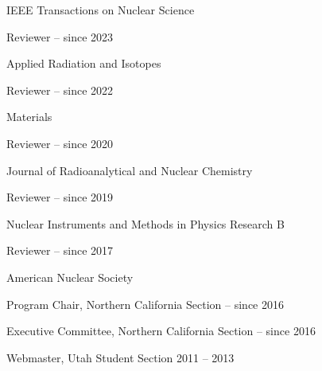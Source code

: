 \begin{list1}
\item[] IEEE Transactions on Nuclear Science
\begin{list2}
\item Reviewer \hfill{ -- since 2023}
\end{list2}
\item[] Applied Radiation and Isotopes
\begin{list2}
\item Reviewer \hfill{ -- since 2022}
\end{list2}
\item[] Materials
\begin{list2}
\item Reviewer \hfill{ -- since 2020}
\end{list2}
\item[] Journal of Radioanalytical and Nuclear Chemistry
\begin{list2}
\item Reviewer \hfill{ -- since 2019}
\end{list2}
\item[] Nuclear Instruments and Methods in Physics Research B  
\begin{list2}
\item Reviewer \hfill{ -- since 2017}
\end{list2}
\item[] American Nuclear Society  
\begin{list2}
\item Program Chair, Northern California Section \hfill{ -- since 2016}
\item Executive Committee, Northern California Section \hfill{ -- since 2016}
\item Webmaster, Utah Student Section \hfill{2011 --  2013}
\end{list2}
\end{list1}
